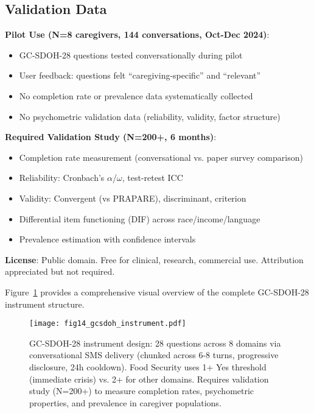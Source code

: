 \documentclass{article}
\begin{document}
\subsection*{Validation Data}

\textbf{Pilot Use (N=8 caregivers, 144 conversations, Oct-Dec 2024)}:
\begin{itemize}
    \item GC-SDOH-28 questions tested conversationally during pilot
    \item User feedback: questions felt ``caregiving-specific'' and ``relevant''
    \item No completion rate or prevalence data systematically collected
    \item No psychometric validation data (reliability, validity, factor structure)
\end{itemize}

\textbf{Required Validation Study (N=200+, 6 months)}:
\begin{itemize}
    \item Completion rate measurement (conversational vs. paper survey comparison)
    \item Reliability: Cronbach's $\alpha$/$\omega$, test-retest ICC
    \item Validity: Convergent (vs PRAPARE), discriminant, criterion
    \item Differential item functioning (DIF) across race/income/language
    \item Prevalence estimation with confidence intervals
\end{itemize}

\textbf{License}: Public domain. Free for clinical, research, commercial use. Attribution appreciated but not required.

Figure~\ref{fig:gcsdoh_visual} provides a comprehensive visual overview of the complete GC-SDOH-28 instrument structure.

%
\begin{figure}[htbp]%
\centering%
\texttt{[image: fig14\_gcsdoh\_instrument.pdf]}%
\caption{GC-SDOH-28 instrument design: 28 questions across 8 domains via conversational SMS delivery (chunked across 6-8 turns, progressive disclosure, 24h cooldown). Food Security uses 1+ Yes threshold (immediate crisis) vs. 2+ for other domains. Requires validation study (N=200+) to measure completion rates, psychometric properties, and prevalence in caregiver populations.}%
\label{fig:gcsdoh_visual}%
\end{figure}%
\end{document}
